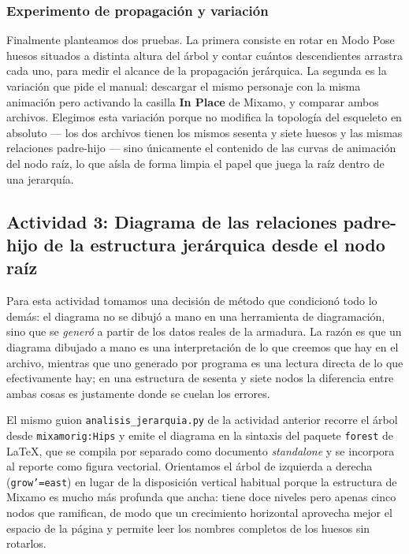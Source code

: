 \subsubsection{Experimento de propagación y variación}
Finalmente planteamos dos pruebas. La primera consiste en rotar en Modo Pose huesos situados a distinta altura del árbol y contar cuántos descendientes arrastra cada uno, para medir el alcance de la propagación jerárquica. La segunda es la variación que pide el manual: descargar el mismo personaje con la misma animación pero activando la casilla \textbf{In Place} de Mixamo, y comparar ambos archivos. Elegimos esta variación porque no modifica la topología del esqueleto en absoluto --- los dos archivos tienen los mismos sesenta y siete huesos y las mismas relaciones padre-hijo --- sino únicamente el contenido de las curvas de animación del nodo raíz, lo que aísla de forma limpia el papel que juega la raíz dentro de una jerarquía.

\subsection{Actividad 3: Diagrama de las relaciones padre-hijo de la estructura jerárquica desde el nodo raíz}

Para esta actividad tomamos una decisión de método que condicionó todo lo demás: el diagrama no se dibujó a mano en una herramienta de diagramación, sino que se \textit{generó} a partir de los datos reales de la armadura. La razón es que un diagrama dibujado a mano es una interpretación de lo que creemos que hay en el archivo, mientras que uno generado por programa es una lectura directa de lo que efectivamente hay; en una estructura de sesenta y siete nodos la diferencia entre ambas cosas es justamente donde se cuelan los errores.

El mismo guion \texttt{analisis\_jerarquia.py} de la actividad anterior recorre el árbol desde \texttt{mixamorig:Hips} y emite el diagrama en la sintaxis del paquete \texttt{forest} de \LaTeX, que se compila por separado como documento \textit{standalone} y se incorpora al reporte como figura vectorial. Orientamos el árbol de izquierda a derecha (\texttt{grow'=east}) en lugar de la disposición vertical habitual porque la estructura de Mixamo es mucho más profunda que ancha: tiene doce niveles pero apenas cinco nodos que ramifican, de modo que un crecimiento horizontal aprovecha mejor el espacio de la página y permite leer los nombres completos de los huesos sin rotarlos.

